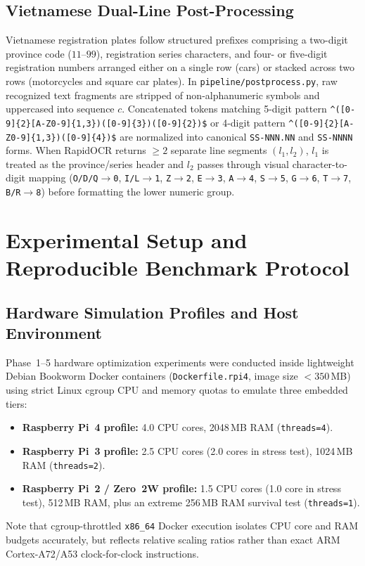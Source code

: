 \documentclass[pdflatex,sn-mathphys-num]{sn-jnl}
\begin{document}
\subsection{Vietnamese Dual-Line Post-Processing}\label{subsec:postprocess}
Vietnamese registration plates follow structured prefixes comprising a two-digit province code ($11$--$99$), registration series characters, and four- or five-digit registration numbers arranged either on a single row (cars) or stacked across two rows (motorcycles and square car plates). In \texttt{pipeline/postprocess.py}, raw recognized text fragments are stripped of non-alphanumeric symbols and uppercased into sequence $c$. Concatenated tokens matching 5-digit pattern \verb|^([0-9]{2}[A-Z0-9]{1,3})([0-9]{3})([0-9]{2})$| or 4-digit pattern \verb|^([0-9]{2}[A-Z0-9]{1,3})([0-9]{4})$| are normalized into canonical \texttt{SS-NNN.NN} and \texttt{SS-NNNN} forms. When RapidOCR returns $\ge 2$ separate line segments $(l_1, l_2)$, $l_1$ is treated as the province/series header and $l_2$ passes through visual character-to-digit mapping (\texttt{O/D/Q$\rightarrow$0}, \texttt{I/L$\rightarrow$1}, \texttt{Z$\rightarrow$2}, \texttt{E$\rightarrow$3}, \texttt{A$\rightarrow$4}, \texttt{S$\rightarrow$5}, \texttt{G$\rightarrow$6}, \texttt{T$\rightarrow$7}, \texttt{B/R$\rightarrow$8}) before formatting the lower numeric group.

\section{Experimental Setup and Reproducible Benchmark Protocol}\label{sec:setup}

\subsection{Hardware Simulation Profiles and Host Environment}\label{subsec:env}
Phase~1--5 hardware optimization experiments were conducted inside lightweight Debian Bookworm Docker containers (\texttt{Dockerfile.rpi4}, image size $<350$\,MB) using strict Linux cgroup CPU and memory quotas to emulate three embedded tiers:
\begin{itemize}
    \item \textbf{Raspberry Pi~4 profile:} 4.0 CPU cores, 2048\,MB RAM (\texttt{threads=4}).
    \item \textbf{Raspberry Pi~3 profile:} 2.5 CPU cores (2.0 cores in stress test), 1024\,MB RAM (\texttt{threads=2}).
    \item \textbf{Raspberry Pi~2 / Zero~2W profile:} 1.5 CPU cores (1.0 core in stress test), 512\,MB RAM, plus an extreme 256\,MB RAM survival test (\texttt{threads=1}).
\end{itemize}
Note that cgroup-throttled \texttt{x86\_64} Docker execution isolates CPU core and RAM budgets accurately, but reflects relative scaling ratios rather than exact ARM Cortex-A72/A53 clock-for-clock instructions.
\end{document}
